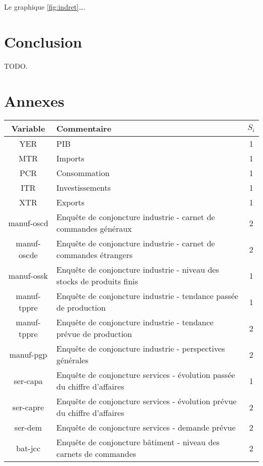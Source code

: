\documentclass[10pt,french,french]{article}
\begin{document}
Le graphique \ref{fig:indret}\ldots.

\hypertarget{conclusion}{%
\section{Conclusion}\label{conclusion}}

TODO.

\newpage

\hypertarget{annexes}{%
\section{Annexes}\label{annexes}}

\begin{table}[h]{\centering
   \begin{tabular}{ | c | l | c|}
     \hline
     \textbf{Variable} & \textbf{Commentaire} & $S_i$ \\ \hline
     YER & PIB & 1\\ \hline
     MTR & Imports & 1 \\ \hline
     PCR & Consommation & 1\\ \hline
     ITR & Investissements & 1 \\ \hline
     XTR & Exports & 1 \\ \hline
     manuf-oscd & Enquête de conjoncture industrie -  carnet de commandes généraux & 2 \\ \hline
     manuf-oscde & Enquête de conjoncture industrie - carnet de commandes étrangers & 2 \\ \hline
     manuf-ossk & Enquête de conjoncture industrie - niveau des stocks de produits finis & 1\\ \hline
     manuf-tppre & Enquête de conjoncture industrie - tendance passée de production & 1\\ \hline
     manuf-tppre & Enquête de conjoncture industrie - tendance prévue de production & 2\\ \hline
     manuf-pgp & Enquête de conjoncture industrie - perspectives générales & 2\\ \hline
     ser-capa & Enquête de conjoncture services - évolution passée du chiffre d'affaires & 1\\ \hline
     ser-capre & Enquête de conjoncture services - évolution prévue du chiffre d'affaires & 2\\ \hline
     ser-dem & Enquête de conjoncture services - demande prévue  & 2\\ \hline
     bat-jcc & Enquête de conjoncture bâtiment - niveau des carnets de commandes & 2 \\ \hline

\end{tabular}}
\end{table}
\end{document}
